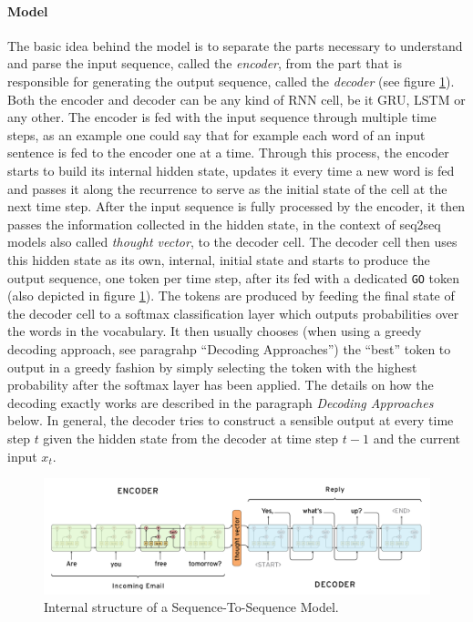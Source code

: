 \paragraph{Model}
The basic idea behind the model is to separate the parts necessary to understand and parse the input sequence, called the \emph{encoder}, from the part that is responsible for generating the output sequence, called the \emph{decoder} (see figure \ref{fundamentals:seq2seq:internal_structure}). Both the encoder and decoder can be any kind of RNN cell, be it GRU, LSTM or any other. The encoder is fed with the input sequence through multiple time steps, as an example one could say that for example each word of an input sentence is fed to the encoder one at a time. Through this process, the encoder starts to build its internal hidden state, updates it every time a new word is fed and passes it along the recurrence to serve as the initial state of the cell at the next time step. After the input sequence is fully processed by the encoder, it then passes the information collected in the hidden state, in the context of seq2seq models also called \emph{thought vector}, to the decoder cell. The decoder cell then uses this hidden state as its own, internal, initial state and starts to produce the output sequence, one token per time step, after its fed with a dedicated \texttt{GO} token (also depicted in figure \ref{fundamentals:seq2seq:internal_structure}). The tokens are produced by feeding the final state of the decoder cell to a softmax classification layer which outputs probabilities over the words in the vocabulary. It then usually chooses (when using a greedy decoding approach, see paragrahp ``Decoding Approaches'') the ``best'' token to output in a greedy fashion by simply selecting the token with the highest probability after the softmax layer has been applied. The details on how the decoding exactly works are described in the paragraph \emph{Decoding Approaches} below. In general, the decoder tries to construct a sensible output at every time step $t$ given the hidden state from the decoder at time step $t-1$ and the current input $x_t$.

\begin{figure}[h]
	\label{fundamentals:seq2seq:internal_structure}
	\centering
	\includegraphics[width=12cm]{img/seq2seq_internal}
	\caption{Internal structure of a Sequence-To-Sequence Model.\protect\footnotemark}
\end{figure}

